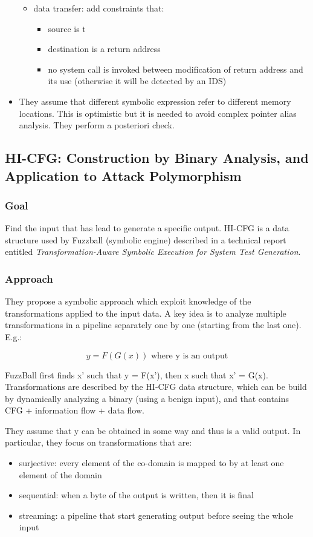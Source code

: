 \documentclass[10pt, a4paper]{article}
\begin{document}
\begin{itemize}
\begin{itemize}
    \item data transfer: add constraints that:
      \begin{itemize}
        \item source is t
        \item destination is a return address 
        \item no system call is invoked between modification of return address and its use (otherwise it will be detected by an IDS)
      \end{itemize}
  \end{itemize}
  \item They assume that different symbolic expression refer to different memory locations. This is optimistic but it is needed to avoid complex pointer alias analysis. They perform a posteriori check.

\end{itemize}

\subsection{\cite{FUZZBALL-13} HI-CFG: Construction by Binary Analysis, and Application to Attack Polymorphism} 

\subsubsection{Goal}
Find the input that has lead to generate a specific output. HI-CFG is a data structure used by Fuzzball (symbolic engine) described in a technical report entitled {\em Transformation-Aware Symbolic Execution for System Test Generation}.

\subsubsection{Approach}
They propose a symbolic approach which exploit knowledge of the transformations applied to the input data. A key idea is to analyze multiple transformations in a pipeline separately one by one (starting from the last one). E.g.:

\[y = F(G(x)) \text{ where y is an output} \]

FuzzBall first finds x' such that y = F(x'), then x such that x' = G(x). Transformations are described by the HI-CFG data structure, which can be build by dynamically analyzing a binary (using a benign input), and that contains CFG + information flow + data flow.

They assume that y can be obtained in some way and thus is a valid output. In particular, they focus on transformations that are:
\begin{itemize}
  \item surjective: every element of the co-domain is mapped to by at least one element of the domain
  \item sequential: when a byte of the output is written, then it is final
  \item streaming: a pipeline that start generating output before seeing the whole input
\end{itemize}
\end{document}
